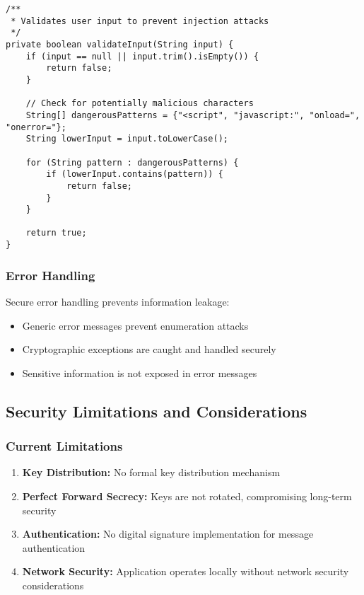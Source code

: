 \documentclass[12pt,a4paper]{article}
\begin{document}
\begin{lstlisting}[caption=Input Validation Implementation]
/**
 * Validates user input to prevent injection attacks
 */
private boolean validateInput(String input) {
    if (input == null || input.trim().isEmpty()) {
        return false;
    }

    // Check for potentially malicious characters
    String[] dangerousPatterns = {"<script", "javascript:", "onload=", "onerror="};
    String lowerInput = input.toLowerCase();

    for (String pattern : dangerousPatterns) {
        if (lowerInput.contains(pattern)) {
            return false;
        }
    }

    return true;
}
\end{lstlisting}

\subsubsection{Error Handling}

Secure error handling prevents information leakage:

\begin{itemize}
    \item Generic error messages prevent enumeration attacks
    \item Cryptographic exceptions are caught and handled securely
    \item Sensitive information is not exposed in error messages
\end{itemize}

\subsection{Security Limitations and Considerations}

\subsubsection{Current Limitations}

\begin{enumerate}
    \item \textbf{Key Distribution:} No formal key distribution mechanism
    \item \textbf{Perfect Forward Secrecy:} Keys are not rotated, compromising long-term security
    \item \textbf{Authentication:} No digital signature implementation for message authentication
    \item \textbf{Network Security:} Application operates locally without network security considerations
\end{enumerate}
\end{document}
